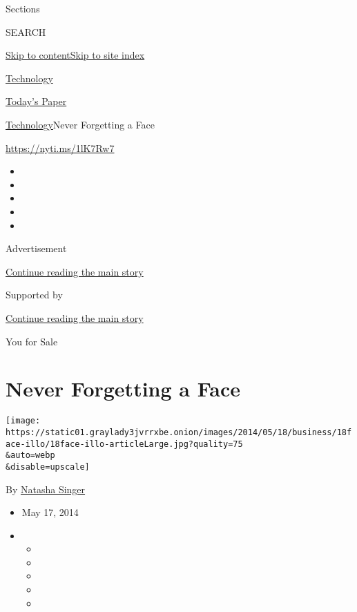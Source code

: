 Sections

SEARCH

\protect\hyperlink{site-content}{Skip to
content}\protect\hyperlink{site-index}{Skip to site index}

\href{https://www.nytimes3xbfgragh.onion/section/technology}{Technology}

\href{https://myaccount.nytimes3xbfgragh.onion/auth/login?response_type=cookie\&client_id=vi}{}

\href{https://www.nytimes3xbfgragh.onion/section/todayspaper}{Today's
Paper}

\href{/section/technology}{Technology}\textbar{}Never Forgetting a Face

\url{https://nyti.ms/1lK7Rw7}

\begin{itemize}
\item
\item
\item
\item
\item
\end{itemize}

Advertisement

\protect\hyperlink{after-top}{Continue reading the main story}

Supported by

\protect\hyperlink{after-sponsor}{Continue reading the main story}

You for Sale

\hypertarget{never-forgetting-a-face}{%
\section{Never Forgetting a Face}\label{never-forgetting-a-face}}

\texttt{[image: https://static01.graylady3jvrrxbe.onion/images/2014/05/18/business/18face-illo/18face-illo-articleLarge.jpg?quality=75\\\&auto=webp\\\&disable=upscale]}

By \href{http://www.nytimes3xbfgragh.onion/by/natasha-singer}{Natasha
Singer}

\begin{itemize}
\item
  May 17, 2014
\item
  \begin{itemize}
  \item
  \item
  \item
  \item
  \item
  \end{itemize}
\end{itemize}

